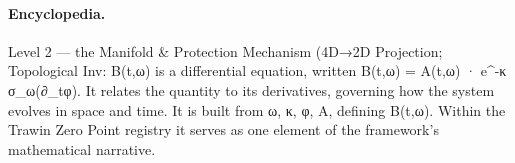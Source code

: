 \paragraph{Encyclopedia.}
Level 2 — the Manifold \& Protection Mechanism (4D→2D Projection; Topological Inv: B(t,ω) is a differential equation, written B(t,ω) = A(t,ω) · e\textasciicircum{}-κ σ\_ω(∂\_tφ). It relates the quantity to its derivatives, governing how the system evolves in space and time. It is built from ω, κ, φ, A, defining B(t,ω). Within the Trawin Zero Point registry it serves as one element of the framework's mathematical narrative.
